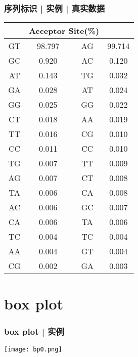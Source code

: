 \begin{frame}
  \frametitle{序列标识 | 实例 | 真实数据}
  \begin{table}
    \centering
    \begin{tabular}{cc|cc}
      \hline
      \rowcolor{blue!50} \multicolumn{2}{c|}{Donor Sites(\%)} & \multicolumn{2}{c}{Acceptor Site(\%)}\\
      \hline
      GT & 98.797 & AG & 99.714\\
      GC & 0.920 & AC & 0.120\\
      AT & 0.143 & TG & 0.032\\
      GA & 0.028 & AT & 0.024\\
      GG & 0.025 & GG & 0.022\\
      CT & 0.018 & AA & 0.019\\
      TT & 0.016 & CG & 0.010\\
      CC & 0.011 & CC & 0.010\\
      TG & 0.007 & TT & 0.009\\
      AG & 0.007 & CT & 0.008\\
      TA & 0.006 & CA & 0.008\\
      AC & 0.006 & GC & 0.007\\
      CA & 0.006 & TA & 0.006\\
      TC & 0.004 & TC & 0.004\\
      AA & 0.004 & GT & 0.004\\
      CG & 0.002 & GA & 0.003\\
      \hline
    \end{tabular}
  \end{table}
\end{frame}

\section{box plot}
\begin{frame}
  \frametitle{box plot | 实例}
  \begin{center}
    \texttt{[image: bp0.png]}
  \end{center}
\end{frame}

